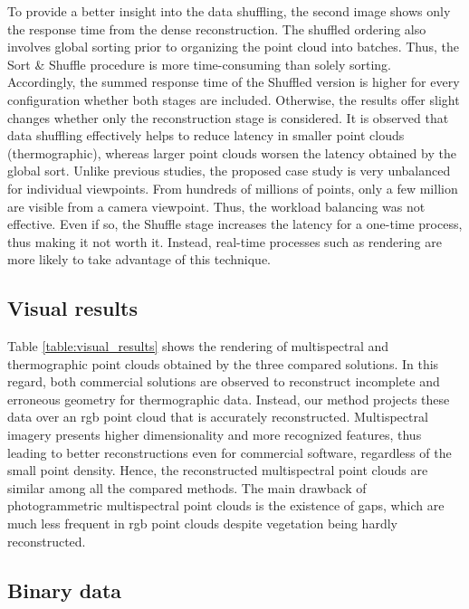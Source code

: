 To provide a better insight into the data shuffling, the second image shows only the response time from the dense reconstruction. The shuffled ordering also involves global sorting prior to organizing the point cloud into batches. Thus, the Sort \& Shuffle procedure is more time-consuming than solely sorting. Accordingly, the summed response time of the Shuffled version is higher for every configuration whether both stages are included. Otherwise, the results offer slight changes whether only the reconstruction stage is considered. It is observed that data shuffling effectively helps to reduce latency in smaller point clouds (thermographic), whereas larger point clouds worsen the latency obtained by the global sort. Unlike previous studies, the proposed case study is very unbalanced for individual viewpoints. From hundreds of millions of points, only a few million are visible from a camera viewpoint. Thus, the workload balancing was not effective. Even if so, the Shuffle stage increases the latency for a one-time process, thus making it not worth it. Instead, real-time processes such as rendering are more likely to take advantage of this technique.

\subsection{Visual results}

Table \ref{table:visual_results} shows the rendering of multispectral and thermographic point clouds obtained by the three compared solutions. In this regard, both commercial solutions are observed to reconstruct incomplete and erroneous geometry for thermographic data. Instead, our method projects these data over an \acrshort{rgb} point cloud that is accurately reconstructed. Multispectral imagery presents higher dimensionality and more recognized features, thus leading to better reconstructions even for commercial software, regardless of the small point density. Hence, the reconstructed multispectral point clouds are similar among all the compared methods. The main drawback of photogrammetric multispectral point clouds is the existence of gaps, which are much less frequent in \acrshort{rgb} point clouds despite vegetation being hardly reconstructed. 

\subsection{Binary data}

